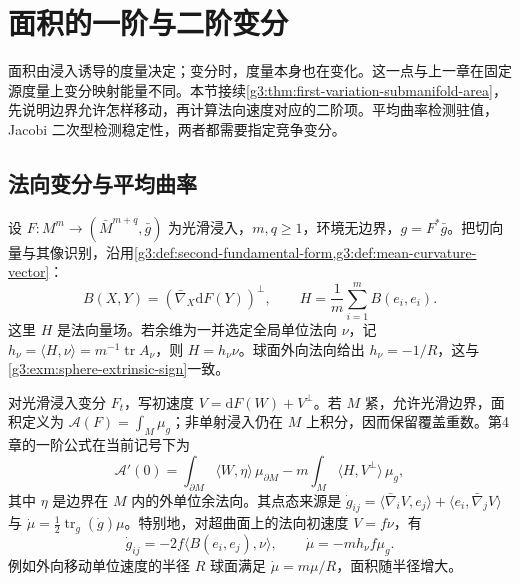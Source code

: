 
% 
% 

\section{面积的一阶与二阶变分}
\label{g3:sec:1901}

面积由浸入诱导的度量决定；变分时，度量本身也在变化。这一点与上一章在固定源度量上变分映射能量不同。本节接续\cref{g3:thm:first-variation-submanifold-area}，先说明边界允许怎样移动，再计算法向速度对应的二阶项。平均曲率检测驻值，Jacobi 二次型检测稳定性，两者都需要指定竞争变分。

\subsection{法向变分与平均曲率}
\label{g3:subsec:1901:01}
设 \(F:M^m\to(\bar M^{m+q},\bar g)\) 为光滑浸入，\(m,q\ge1\)，环境无边界，\(g=F^*\bar g\)。把切向量与其像识别，沿用\cref{g3:def:second-fundamental-form,g3:def:mean-curvature-vector}：
\[
	B(X,Y)=(\bar\nabla_X\mathrm dF(Y))^\perp,
	\qquad H=\frac1m\sum_{i=1}^mB(e_i,e_i).
\]
这里 \(H\) 是法向量场。若余维为一并选定全局单位法向 \(\nu\)，记
\(h_\nu=\langle H,\nu\rangle=m^{-1}\operatorname{tr}A_\nu\)，则 \(H=h_\nu\nu\)。球面外向法向给出 \(h_\nu=-1/R\)，这与\cref{g3:exm:sphere-extrinsic-sign}一致。

\ProseParagraphBreak

对光滑浸入变分 \(F_t\)，写初速度 \(V=\mathrm dF(W)+V^\perp\)。若 \(M\) 紧，允许光滑边界，面积定义为
\(\mathcal A(F)=\int_M\mu_g\)；非单射浸入仍在 \(M\) 上积分，因而保留覆盖重数。第4章的一阶公式在当前记号下为
\begin{equation}\label{g3:eq:submanifold-area-first-variation}
	\mathcal A'(0)=\int_{\partial M}\langle W,\eta\rangle\,\mu_{\partial M}
	-m\int_M\langle H,V^\perp\rangle\,\mu_g,
\end{equation}
其中 \(\eta\) 是边界在 \(M\) 内的外单位余法向。其点态来源是
\(\dot g_{ij}=\langle\bar\nabla_iV,e_j\rangle+\langle e_i,\bar\nabla_jV\rangle\) 与
\(\dot\mu=\frac12\operatorname{tr}_g(\dot g)\mu\)。特别地，对超曲面上的法向初速度 \(V=f\nu\)，有
\begin{equation}\label{g3:eq:normal-area-density-variation}
	\dot g_{ij}=-2f\langle B(e_i,e_j),\nu\rangle,
	\qquad \dot\mu=-m h_\nu f\mu_g.
\end{equation}
例如外向移动单位速度的半径 \(R\) 球面满足 \(\dot\mu=m\mu/R\)，面积随半径增大。

